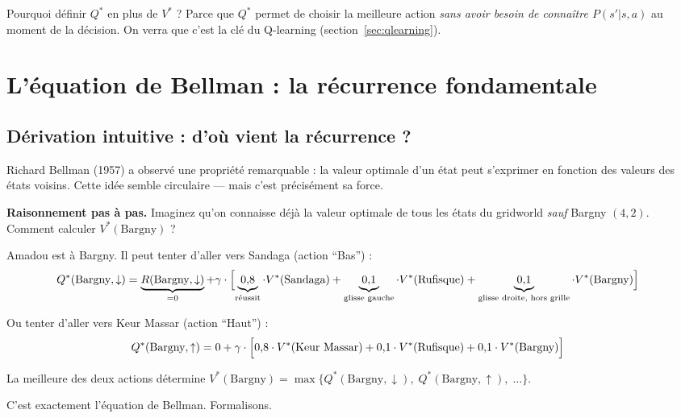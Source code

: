 \documentclass[11pt,a4paper]{article}
\begin{document}
Pourquoi définir $Q^*$ en plus de $V^*$ ? Parce que $Q^*$ permet de choisir la meilleure action \textit{sans avoir besoin de connaître $P(s'|s,a)$} au moment de la décision. On verra que c'est la clé du Q-learning (section~\ref{sec:qlearning}).

\section{L'équation de Bellman : la récurrence fondamentale}

\subsection{Dérivation intuitive : d'où vient la récurrence ?}

Richard Bellman (1957) a observé une propriété remarquable : la valeur optimale d'un état peut s'exprimer en fonction des valeurs des états voisins. Cette idée semble circulaire --- mais c'est précisément sa force.

\textbf{Raisonnement pas à pas.} Imaginez qu'on connaisse déjà la valeur optimale de tous les états du gridworld \textit{sauf} Bargny $(4,2)$. Comment calculer $V^*(\text{Bargny})$ ?

Amadou est à Bargny. Il peut tenter d'aller vers Sandaga (action ``Bas'') :
\begin{align*}
Q^*(\text{Bargny}, \downarrow) &= \underbrace{R(\text{Bargny}, \downarrow)}_{= 0} + \gamma \cdot \Bigl[\underbrace{0{,}8}_{\text{réussit}} \cdot V^*(\text{Sandaga}) + \underbrace{0{,}1}_{\text{glisse gauche}} \cdot V^*(\text{Rufisque}) + \underbrace{0{,}1}_{\text{glisse droite, hors grille}} \cdot V^*(\text{Bargny})\Bigr]
\end{align*}

Ou tenter d'aller vers Keur Massar (action ``Haut'') :
\begin{align*}
Q^*(\text{Bargny}, \uparrow) &= 0 + \gamma \cdot \Bigl[0{,}8 \cdot V^*(\text{Keur Massar}) + 0{,}1 \cdot V^*(\text{Rufisque}) + 0{,}1 \cdot V^*(\text{Bargny})\Bigr]
\end{align*}

La meilleure des deux actions détermine $V^*(\text{Bargny}) = \max\{Q^*(\text{Bargny}, \downarrow),\; Q^*(\text{Bargny}, \uparrow),\; \ldots\}$.

C'est exactement l'équation de Bellman. Formalisons.
\end{document}
